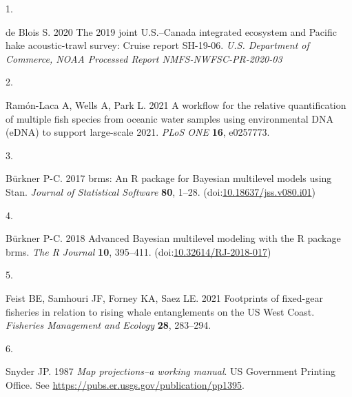 \documentclass[
]{article}
\newlength{\cslhangindent}
\newlength{\csllabelwidth}
\newlength{\cslentryspacingunit} %
\newenvironment{CSLReferences}[2] %
 {%
  \setlength{\parindent}{0pt}
  \ifodd #1
  \let\oldpar\par
  \def\par{\hangindent=\cslhangindent\oldpar}
  \fi
  \setlength{\parskip}{#2\cslentryspacingunit}
 }%
 {}
\newcommand{\CSLLeftMargin}[1]{\parbox[t]{\csllabelwidth}{#1}}
\newcommand{\CSLRightInline}[1]{\parbox[t]{\linewidth - \csllabelwidth}{#1}\break}
\begin{document}
\hypertarget{refs}{}
\begin{CSLReferences}{0}{0}
\leavevmode{}%
\CSLLeftMargin{1. }
\CSLRightInline{de Blois S. 2020 The 2019 joint {U.S.}--{Canada}
integrated ecosystem and {P}acific hake acoustic-trawl survey: Cruise
report SH-19-06. \emph{U.S. Department of Commerce, NOAA Processed
Report NMFS-NWFSC-PR-2020-03} }

\leavevmode{}%
\CSLLeftMargin{2. }
\CSLRightInline{Ramón-Laca A, Wells A, Park L. 2021 A workflow for the
relative quantification of multiple fish species from oceanic water
samples using environmental DNA (eDNA) to support large-scale 2021.
\emph{PLoS ONE} \textbf{16}, e0257773.}

\leavevmode{}%
\CSLLeftMargin{3. }
\CSLRightInline{Bürkner P-C. 2017 {brms}: An {R} package for {Bayesian}
multilevel models using {Stan}. \emph{Journal of Statistical Software}
\textbf{80}, 1--28.
(doi:\href{https://doi.org/10.18637/jss.v080.i01}{10.18637/jss.v080.i01})}

\leavevmode{}%
\CSLLeftMargin{4. }
\CSLRightInline{Bürkner P-C. 2018 Advanced {Bayesian} multilevel
modeling with the {R} package {brms}. \emph{The R Journal} \textbf{10},
395--411.
(doi:\href{https://doi.org/10.32614/RJ-2018-017}{10.32614/RJ-2018-017})}

\leavevmode{}%
\CSLLeftMargin{5. }
\CSLRightInline{Feist BE, Samhouri JF, Forney KA, Saez LE. 2021
Footprints of fixed-gear fisheries in relation to rising whale
entanglements on the {US West Coast}. \emph{Fisheries Management and
Ecology} \textbf{28}, 283--294.}

\leavevmode{}%
\CSLLeftMargin{6. }
\CSLRightInline{Snyder JP. 1987 \emph{Map projections--a working
manual}. US Government Printing Office. See
\url{https://pubs.er.usgs.gov/publication/pp1395}.}

\end{CSLReferences}
\end{document}
